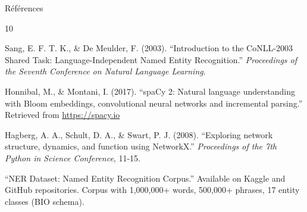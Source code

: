 \documentclass[10pt]{beamer}
\begin{document}
\begin{frame}[allowframebreaks]{Références}
    \begin{thebibliography}{10}
    
        Sang, E. F. T. K., \& De Meulder, F. (2003).
        ``Introduction to the CoNLL-2003 Shared Task: Language-Independent Named Entity Recognition.''
        \textit{Proceedings of the Seventh Conference on Natural Language Learning}.
        
        Honnibal, M., \& Montani, I. (2017).
        ``spaCy 2: Natural language understanding with Bloom embeddings, convolutional neural networks and incremental parsing.''
        Retrieved from \url{https://spacy.io}
        
        Hagberg, A. A., Schult, D. A., \& Swart, P. J. (2008).
        ``Exploring network structure, dynamics, and function using NetworkX.''
        \textit{Proceedings of the 7th Python in Science Conference}, 11-15.
        
        ``NER Dataset: Named Entity Recognition Corpus.''
        Available on Kaggle and GitHub repositories.
        Corpus with 1,000,000+ words, 500,000+ phrases, 17 entity classes (BIO schema).
        
    \end{thebibliography}
\end{frame}
\end{document}
